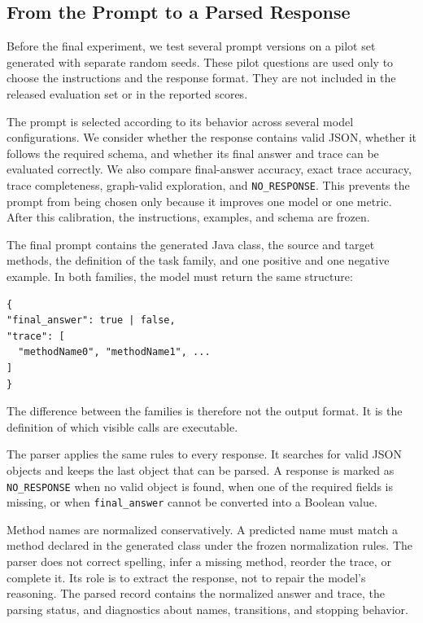 \subsection{From the Prompt to a Parsed Response}
\label{subsec:prompt-calibration}
\label{subsec:parsing}

Before the final experiment, we test several prompt versions on a pilot set generated with separate random seeds. These pilot questions are used only to choose the instructions and the response format. They are not included in the released evaluation set or in the reported scores.

The prompt is selected according to its behavior across several model configurations. We consider whether the response contains valid JSON, whether it follows the required schema, and whether its final answer and trace can be evaluated correctly. We also compare final-answer accuracy, exact trace accuracy, trace completeness, graph-valid exploration, and \texttt{NO\_RESPONSE}. This prevents the prompt from being chosen only because it improves one model or one metric. After this calibration, the instructions, examples, and schema are frozen.

The final prompt contains the generated Java class, the source and target methods, the definition of the task family, and one positive and one negative example. In both families, the model must return the same structure:
\begin{verbatim}
{
"final_answer": true | false,
"trace": [
  "methodName0", "methodName1", ...
]
}
\end{verbatim}
The difference between the families is therefore not the output format. It is the definition of which visible calls are executable.

The parser applies the same rules to every response. It searches for valid JSON objects and keeps the last object that can be parsed. A response is marked as \texttt{NO\_RESPONSE} when no valid object is found, when one of the required fields is missing, or when \texttt{final\_answer} cannot be converted into a Boolean value.

Method names are normalized conservatively. A predicted name must match a method declared in the generated class under the frozen normalization rules. The parser does not correct spelling, infer a missing method, reorder the trace, or complete it. Its role is to extract the response, not to repair the model's reasoning. The parsed record contains the normalized answer and trace, the parsing status, and diagnostics about names, transitions, and stopping behavior.


